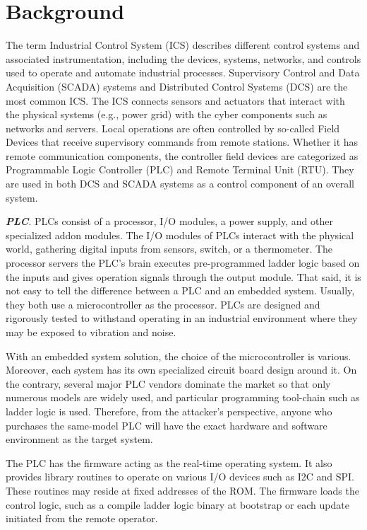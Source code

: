 \section{Background}
\label{sec:implant-background}


The term Industrial Control System (ICS) describes different control systems and associated instrumentation, including the devices, systems, networks, and controls used to operate and automate industrial processes. Supervisory Control and Data Acquisition (SCADA) systems and Distributed Control Systems (DCS) are the most common ICS. The ICS connects sensors and actuators that interact with the physical systems (e.g., power grid) with the cyber components such as networks and servers. Local operations are often controlled by so-called Field Devices that receive supervisory commands from remote stations. Whether it has remote communication components, the controller field devices are categorized as Programmable Logic Controller (PLC) and Remote Terminal Unit (RTU). They are used in both DCS and SCADA systems as a control component of an overall system. 

\textbf{\textit{PLC}}. PLCs consist of a processor, I/O modules, a power supply, and other specialized addon modules. The I/O modules of PLCs interact with the physical world, gathering digital inputs from sensors, switch, or a thermometer. The processor servers the PLC's brain executes pre-programmed ladder logic based on the inputs and gives operation signals through the output module. That said, it is not easy to tell the difference between a PLC and an embedded system. Usually, they both use a microcontroller as the processor. PLCs are designed and rigorously tested to withstand operating in an industrial environment where they may be exposed to vibration and noise. 

With an embedded system solution, the choice of the microcontroller is various. Moreover, each system has its own specialized circuit board design around it. On the contrary, several major PLC vendors dominate the market so that only numerous models are widely used, and particular programming tool-chain such as ladder logic is used. Therefore, from the attacker's perspective, anyone who purchases the same-model PLC will have the exact hardware and software environment as the target system.

The PLC has the firmware acting as the real-time operating system. It also provides library routines to operate on various I/O devices such as I2C and SPI. These routines may reside at fixed addresses of the ROM. The firmware loads the control logic, such as a compile ladder logic binary at bootstrap or each update initiated from the remote operator.


